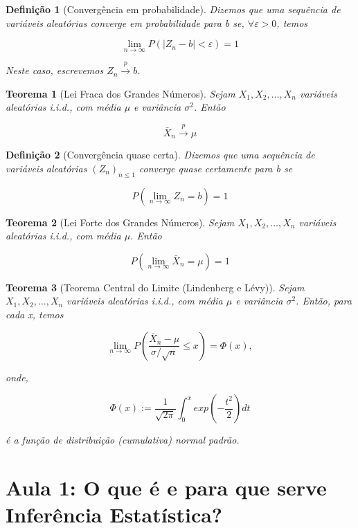 \documentclass{article}
\newtheorem{theorem}{Teorema}
\newtheorem{definition}{Definição}
\begin{document}
	\begin{definition}[Convergência em probabilidade]
		Dizemos que uma sequência de variáveis aleatórias converge em probabilidade para b se, $\forall \varepsilon > 0$, temos
		
		$$\lim_{n \to \infty} P(|Z_n - b| < \varepsilon) = 1$$
		
		Neste caso, escrevemos $Z_n \xrightarrow{p} b$.
	\end{definition}
	
	\begin{theorem}[Lei Fraca dos Grandes Números]
		Sejam $X_1, X_2, \ldots, X_n$ variáveis aleatórias i.i.d., com média $\mu$ e variância $\sigma^2$. Então
		
		$$\bar{X}_n \xrightarrow{p} \mu$$
	\end{theorem}
	
	\begin{definition}[Convergência quase certa]
		Dizemos que uma sequência de variáveis aleatórias $(Z_n)_{n \leq 1}$ converge quase certamente para b se
		
		$$P(\lim_{n \to \infty} Z_n = b) = 1$$
	\end{definition}
	
	\begin{theorem}[Lei Forte dos Grandes Números]
		Sejam $X_1, X_2, \ldots, X_n$ variáveis aleatórias i.i.d., com média $\mu$. Então
		
		$$P(\lim_{n \to \infty} \bar{X}_n = \mu) = 1$$
	\end{theorem}
	
	\begin{theorem}[Teorema Central do Limite (Lindenberg e Lévy)]
		Sejam $X_1, X_2, \ldots, X_n$ variáveis aleatórias i.i.d., com média $\mu$ e variância $\sigma^2$. Então, para cada x, temos
		
		$$\lim_{n \to \infty} P \left ( \frac{\bar{X}_n - \mu}{\sigma / \sqrt{n}} \leq x \right ) = \Phi(x),$$
		
		onde,
		
		$$\Phi(x) := \frac{1}{\sqrt{2 \pi}} \int_0^x exp \left(- \frac{t^2}{2} \right) d t$$
		
		é a função de distribuição (cumulativa) normal padrão.
	\end{theorem}
	
	\section*{Aula 1: O que é e para que serve Inferência Estatística?}
	\label{s1}
	
\end{document}

